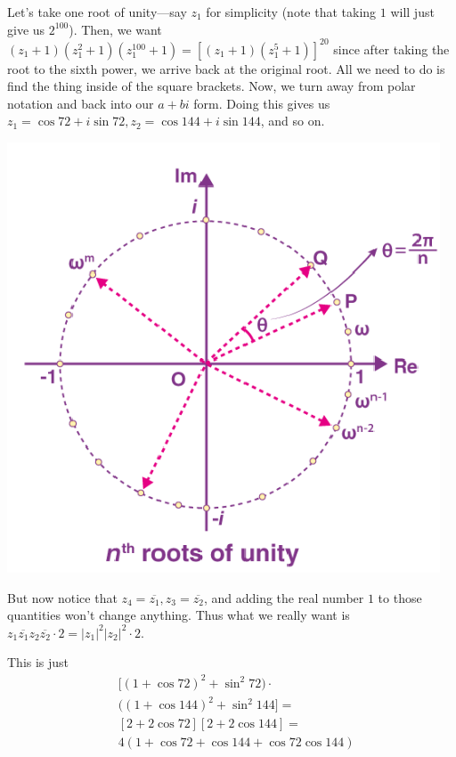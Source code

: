 \documentclass{article}
\begin{document}
Let’s take one root of unity—say $z_1$ for simplicity (note that taking $1$ will just give us $2^100$). Then, we want $(z_1+1)(z_1^2+1)(z_1^{100}+1)=[(z_1+1)(z_1^5+1)]^20$ since after taking the root to the sixth power, we arrive back at the original root. All we need to do is find the thing inside of the square brackets. Now, we turn away from polar notation and back into our $a+bi$ form. Doing this gives us $z_1=\cos 72+i\sin 72, z_2=\cos 144+i\sin 144$, and so on. 
\begin{center}
    \includegraphics[scale=0.7]{images/root1.png}
\end{center}
But now notice that $z_4=\overline{z_1}, z_3=\overline{z_2}$, and adding the real number $1$ to those quantities won't change anything. Thus what we really want is 
$z_1\overline{z_1}z_2\overline{z_2}\cdot 2=|z_1|^2|z_2|^2\cdot 2$. 

This is just 
\begin{align*}
 & [(1+\cos 72)^2+\sin^2 72)  \cdot   \\
 & ((1+\cos 144)^2+\sin^2 144]  = \\
 & [2+2\cos 72][2+2\cos 144]  = \\
 & 4(1+\cos 72+\cos 144+\cos 72 \cos 144)
\end{align*}
\end{document}
